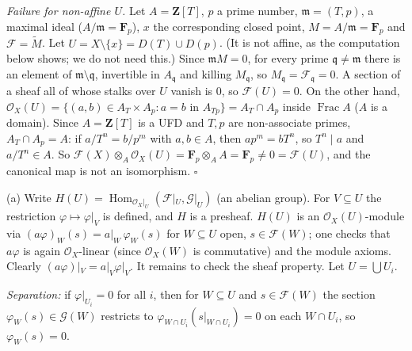\documentclass[11pt]{article}
\begin{document}
\emph{Failure for non-affine $U$.} Let $A=\mathbf{Z}[T]$, $p$ a prime number, $\mathfrak{m}=(T,p)$, a maximal ideal ($A/\mathfrak{m}=\mathbf{F}_p$), $x$ the corresponding closed point, $M=A/\mathfrak{m}=\mathbf{F}_p$ and $\mathcal{F}=\widetilde M$. Let $U=X\setminus\{x\}=D(T)\cup D(p)$. (It is not affine, as the computation below shows; we do not need this.) Since $\mathfrak{m}M=0$, for every prime $\mathfrak{q}\neq\mathfrak{m}$ there is an element of $\mathfrak{m}\setminus\mathfrak{q}$, invertible in $A_\mathfrak{q}$ and killing $M_\mathfrak{q}$, so $M_\mathfrak{q}=\mathcal{F}_\mathfrak{q}=0$. A section of a sheaf all of whose stalks over $U$ vanish is $0$, so $\mathcal{F}(U)=0$. On the other hand, $\mathcal{O}_X(U)=\{(a,b)\in A_T\times A_p: a=b\text{ in }A_{Tp}\}=A_T\cap A_p$ inside $\operatorname{Frac}A$ ($A$ is a domain). Since $A=\mathbf{Z}[T]$ is a UFD and $T,p$ are non-associate primes, $A_T\cap A_p=A$: if $a/T^n=b/p^m$ with $a,b\in A$, then $ap^m=bT^n$, so $T^n\mid a$ and $a/T^n\in A$. So $\mathcal{F}(X)\otimes_A\mathcal{O}_X(U)=\mathbf{F}_p\otimes_AA=\mathbf{F}_p\neq0=\mathcal{F}(U)$, and the canonical map is not an isomorphism. \hfill$\square$

\pf
(a) Write $H(U)=\operatorname{Hom}_{\mathcal{O}_X|_U}(\mathcal{F}|_U,\mathcal{G}|_U)$ (an abelian group). For $V\subseteq U$ the restriction $\varphi\mapsto\varphi|_V$ is defined, and $H$ is a presheaf. $H(U)$ is an $\mathcal{O}_X(U)$-module via $(a\varphi)_W(s)=a|_W\,\varphi_W(s)$ for $W\subseteq U$ open, $s\in\mathcal{F}(W)$; one checks that $a\varphi$ is again $\mathcal{O}_X$-linear (since $\mathcal{O}_X(W)$ is commutative) and the module axioms. Clearly $(a\varphi)|_V=a|_V\varphi|_V$. It remains to check the sheaf property. Let $U=\bigcup U_i$.

\emph{Separation:} if $\varphi|_{U_i}=0$ for all $i$, then for $W\subseteq U$ and $s\in\mathcal{F}(W)$ the section $\varphi_W(s)\in\mathcal{G}(W)$ restricts to $\varphi_{W\cap U_i}(s|_{W\cap U_i})=0$ on each $W\cap U_i$, so $\varphi_W(s)=0$.
\end{document}
